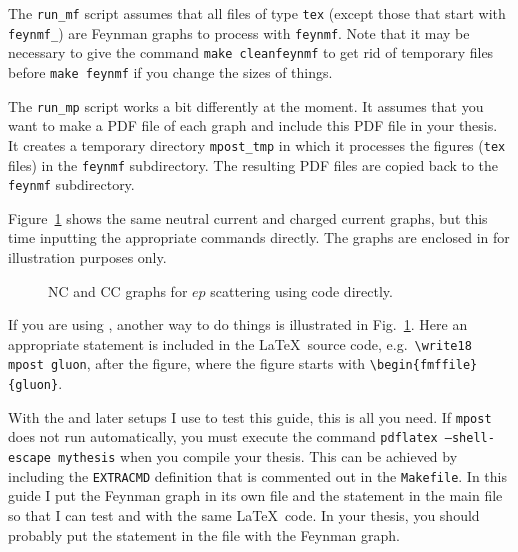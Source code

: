 The \texttt{run\_mf} script assumes that all files of type
\texttt{tex} (except those that start with \texttt{feynmf\_}) are
Feynman graphs to process with \texttt{feynmf}. Note that it may be
necessary to give the command \texttt{make cleanfeynmf} to get rid of
temporary files before \texttt{make feynmf} if you change the sizes of
things.

The \texttt{run\_mp} script works a bit differently at the moment. It
assumes that you want to make a PDF file of each graph and include
this PDF file in your thesis. It creates a temporary directory
\texttt{mpost\_tmp} in which it processes the figures (\texttt{tex}
files) in the \texttt{feynmf} subdirectory. The resulting PDF files are
copied back to the \texttt{feynmf} subdirectory.

Figure~\ref{fig:nccc-feynmf} shows the same neutral current and
charged current graphs, but this time inputting the appropriate
 commands directly. The graphs are enclosed in
 for illustration purposes only.

\begin{figure}[htbp]
  \centering
  \fbox{}
   {%
  }{
  }
  \qquad
  \fbox{}
   {%
  }{
  }
  \caption{NC and CC graphs for $ep$ scattering using 
    code directly.}
  \label{fig:nccc-feynmf}
\end{figure}

If you are using , another way to do things is
illustrated in Fig.~\ref{fig:nccc-feynmf}. Here an appropriate
 statement is included in the \LaTeX\ source code,
e.g.\ \verb+\write18 mpost gluon+, after the figure, where the figure
starts with \verb+\begin{fmffile}{gluon}+.

With the  and later setups I use to test this guide,
this is all you need. If \texttt{mpost} does not run automatically,
you must execute the command \texttt{pdflatex --shell-escape
  mythesis} when you compile your thesis. This can be achieved by
including the \texttt{EXTRACMD} definition that is commented out in
the \texttt{Makefile}. In this guide I put the Feynman graph in its
own file and the  statement in the main file so that
I can test  and  with the same
\LaTeX\ code. In your thesis, you should probably put the
 statement in the file with the Feynman graph.

